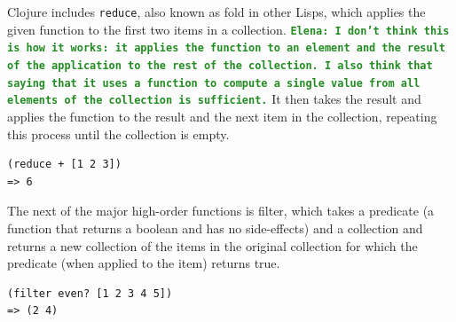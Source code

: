 \documentclass[12pt]{article}
\newcommand{\comment}[1]{{\bf \tt  {#1}}}
\newcommand{\emcomment}[1]{\textcolor{ForestGreen}{\comment{Elena: {#1}}}}
\newcommand{\clocode}[1]{{\texttt {#1}}}
\begin{document}
Clojure includes \clocode{reduce}, also known as fold in other Lisps, which applies the given function to the first two items in a collection. \emcomment{I don't think this is how it works: it applies the function to an element and the result of the application to the rest of the collection. I also think that saying that it uses a function to compute a single value from all elements of the collection is sufficient.} It then takes the result and applies the function to the result and the next item in the collection, repeating this process until the collection is empty.
\begin{verbatim}
(reduce + [1 2 3])
=> 6
\end{verbatim}
The next of the major high-order functions is filter, which takes a predicate (a function that returns a boolean and has no side-effects) and a collection and returns a new collection of the items in the original collection for which the predicate (when applied to the item) returns true.
\begin{verbatim}
(filter even? [1 2 3 4 5])
=> (2 4)
\end{verbatim}
\end{document}
